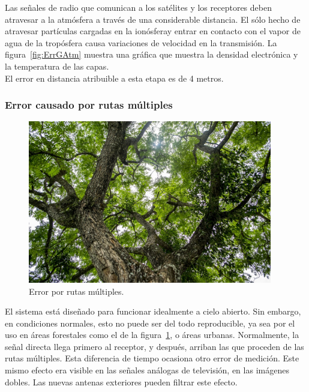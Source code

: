 Las señales de radio que comunican a los satélites y los receptores deben atravesar a la atmósfera a través de una considerable distancia. El sólo hecho de atravesar partículas cargadas en la ionósfera\footnotemark y entrar en contacto con el vapor de agua de la tropósfera causa variaciones de velocidad en la transmisión. La figura~\ref{fig:ErrGAtm} muestra una gráfica que muestra la densidad electrónica y la temperatura de las capas. \\

El error en distancia atribuible a esta etapa es de 4 metros. 


\subsubsection{Error causado por rutas múltiples}

\begin{figure}[H]
\centering
\includegraphics[width=0.95\textwidth]{Figures/RutasMult2}
\caption[Error por rutas múltiples.]{Error por rutas múltiples\footnotemark.}
\label{fig:ErrRMul}
\end{figure}


 El sistema está diseñado para funcionar idealmente a cielo abierto. Sin embargo, en condiciones normales, esto no puede ser del todo reproducible, ya sea por el uso en áreas forestales como el de la figura~\ref{fig:ErrRMul}, o áreas urbanas. Normalmente, la señal directa llega primero al receptor, y después, arriban las que proceden de las rutas múltiples. Esta diferencia de tiempo ocasiona otro error de medición. Este mismo efecto era visible en las señales análogas de televisión, en las imágenes dobles. Las nuevas antenas exteriores pueden filtrar este efecto.

